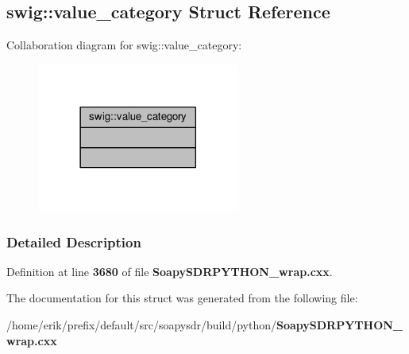 \subsection{swig\+:\+:value\+\_\+category Struct Reference}
\label{structswig_1_1value__category}


Collaboration diagram for swig\+:\+:value\+\_\+category\+:
\nopagebreak
\begin{figure}[H]
\begin{center}
\leavevmode
\includegraphics[width=189pt]{d1/d04/structswig_1_1value__category__coll__graph}
\end{center}
\end{figure}


\subsubsection{Detailed Description}


Definition at line {\bf 3680} of file {\bf Soapy\+S\+D\+R\+P\+Y\+T\+H\+O\+N\+\_\+wrap.\+cxx}.



The documentation for this struct was generated from the following file\+:\begin{DoxyCompactItemize}
\item 
/home/erik/prefix/default/src/soapysdr/build/python/{\bf Soapy\+S\+D\+R\+P\+Y\+T\+H\+O\+N\+\_\+wrap.\+cxx}\end{DoxyCompactItemize}
